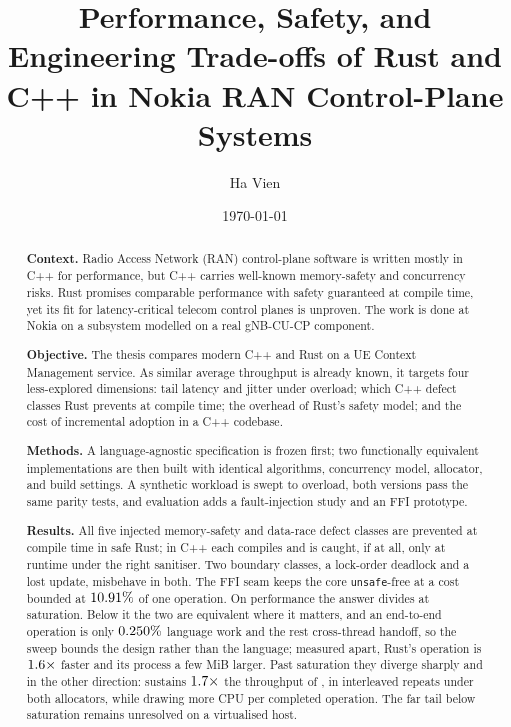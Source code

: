 \documentclass[english,twoside,openright,a4paper,censored,csm,software-track-2020]{HYthesisML}
\title{Performance, Safety, and Engineering Trade-offs of Rust and C++ in Nokia RAN Control-Plane Systems}
\author{Ha Vien}
\date{\today}
\begin{document}
\maketitle


{\singlespacing
\begin{otherlanguage}{english}
\begin{abstract}
\noindent\textbf{Context.}
Radio Access Network (RAN) control-plane software is written mostly in C++ for performance, but
C++ carries well-known memory-safety and concurrency risks. Rust promises comparable
performance with safety guaranteed at compile time, yet its fit for latency-critical telecom
control planes is unproven. The work is done at Nokia on a subsystem modelled on a real
gNB-CU-CP component.

\noindent\textbf{Objective.}
The thesis compares modern C++ and Rust on a UE Context Management service. As similar average
throughput is already known, it targets four less-explored dimensions: tail latency and jitter
under overload; which C++ defect classes Rust prevents at compile time; the overhead of Rust's
safety model; and the cost of incremental adoption in a C++ codebase.

\noindent\textbf{Methods.}
A language-agnostic specification is frozen first; two functionally equivalent implementations
are then built with identical algorithms, concurrency model, allocator, and build settings. A
synthetic workload is swept to overload, both versions pass the same parity tests, and
evaluation adds a fault-injection study and an FFI prototype.

\noindent\textbf{Results.}
All five injected memory-safety and data-race defect classes are prevented at compile time in safe
Rust; in C++ each compiles and is caught, if at all, only at runtime under the right sanitiser. Two
boundary classes, a lock-order deadlock and a lost update, misbehave in both. The FFI seam keeps
the core \texttt{unsafe}-free at a cost bounded at $10.91\%$ of one operation. On
performance the answer divides at saturation. Below it the two are equivalent where it matters, and
an end-to-end operation is only $0.250\%$ language work and the rest cross-thread
handoff, so the sweep bounds the design rather than the language; measured apart, Rust's operation
is $1.6\times$ faster and its process a few MiB larger. Past saturation they diverge
sharply and in the other direction: \OverloadSustainedFaster{} sustains
$1.7\times$ the throughput of \OverloadSustainedSlower{}, in
\OverloadThrAgree{} interleaved repeats under both allocators, while drawing more CPU per completed
operation. The far tail below saturation remains unresolved on a virtualised host.


\end{abstract}
\end{otherlanguage}}
\end{document}
